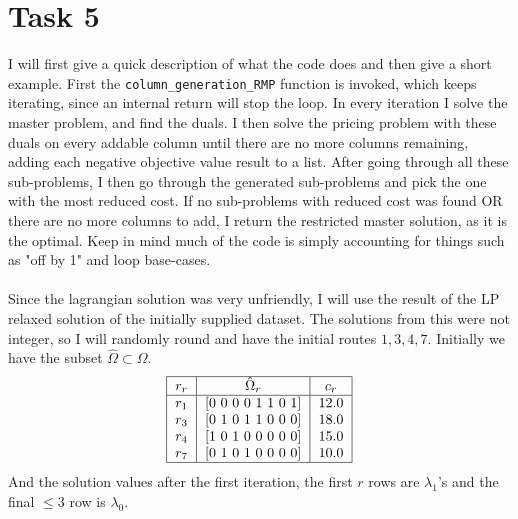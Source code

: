 \documentclass{article}
\begin{document}
    \section*{Task 5}
    I will first give a quick description of what the code does and then give a short example.
    First the \texttt{column\_generation\_RMP} function is invoked, which keeps iterating, since an internal return will stop the loop.
    In every iteration I solve the master problem, and find the duals.
    I then solve the pricing problem with these duals on every addable column until there are no more columns remaining, adding each negative objective value result to a list.
    After going through all these sub-problems, I then go through the generated sub-problems and pick the one with the most reduced cost.
    If no sub-problems with reduced cost was found OR there are no more columns to add, I return the restricted master solution, as it is the optimal.
    Keep in mind much of the code is simply accounting for things such as "off by 1" and loop base-cases.
    \\\\
    Since the lagrangian solution was very unfriendly, I will use the result of the LP relaxed solution of the initially supplied dataset.
    The solutions from this were not integer, so I will randomly round and have the initial routes $1,3,4,7$.
    Initially we have the subset $\hat{\Omega} \subset \Omega$.
    \[
        \begin{tabular}{ |c| c|c|c|c|c|c|c|c | }
            \hline
            $r_r$ &     $\hat{\Omega}_r$    &  $c_r$ \\
            \hline
            $r_1$ &     [0 0 0 0 1 1 0 1]   &  $12.0$ \\
            $r_3$ &     [0 1 0 1 1 0 0 0]   &  $18.0$ \\
            $r_4$ &     [1 0 1 0 0 0 0 0]   &  $15.0$ \\
            $r_7$ &     [0 1 0 1 0 0 0 0]   &  $10.0$ \\
            \hline
        \end{tabular}
    \]
    And the solution values after the first iteration, the first $r$ rows are $\lambda_1$'s and the final $\leq 3$ row is $\lambda_0$.
\end{document}
